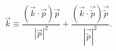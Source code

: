 \begin{equation}
\vec{k}\equiv \frac{(\vec{k} \cdot \vec{p}) \vec{p}}{|\vec{p}|^2} +
\frac{(\vec{k} \cdot \vec{\tilde{p}})
\vec{\tilde{p}}}{|\vec{\tilde{p}}|^2}.
\end{equation}

